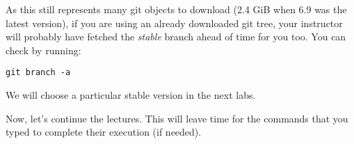 As this still represents many git objects to download (2.4 GiB when 6.9 was
the latest version), if you are using an already downloaded git tree,
your instructor will probably have fetched the {\em stable} branch ahead
of time for you too. You can check by running:

\begin{verbatim}
git branch -a
\end{verbatim}

We will choose a particular stable version in the next labs.

Now, let's continue the lectures. This will leave time for the commands
that you typed to complete their execution (if needed).
